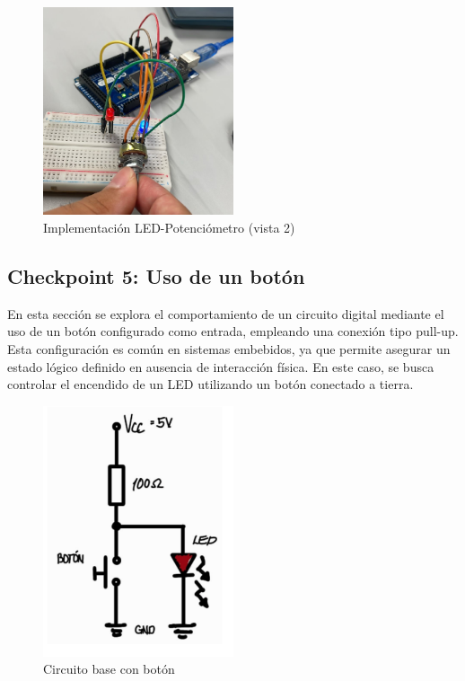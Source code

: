 \documentclass{article}
\begin{document}
\begin{figure}[H]
    \centering
    \includegraphics[width=0.50\textwidth]{./img/ckpt_3_4_1.png}
    \caption{Implementación LED-Potenciómetro (vista 2)}
    \label{fig:simulacion_esquema6}
\end{figure}

\subsection{Checkpoint 5: Uso de un botón}
En esta sección se explora el comportamiento de un circuito digital mediante el uso de un botón configurado como entrada, empleando una conexión tipo pull-up. Esta configuración es común en sistemas embebidos, ya que permite asegurar un estado lógico definido en ausencia de interacción física. En este caso, se busca controlar el encendido de un LED utilizando un botón conectado a tierra.

\begin{figure}[H]
    \centering
    \includegraphics[width=0.50\textwidth]{./img/Circuito-boton.png}
    \caption{Circuito base con botón}
    \label{fig:simulacion_esquema7}
\end{figure}
\end{document}
